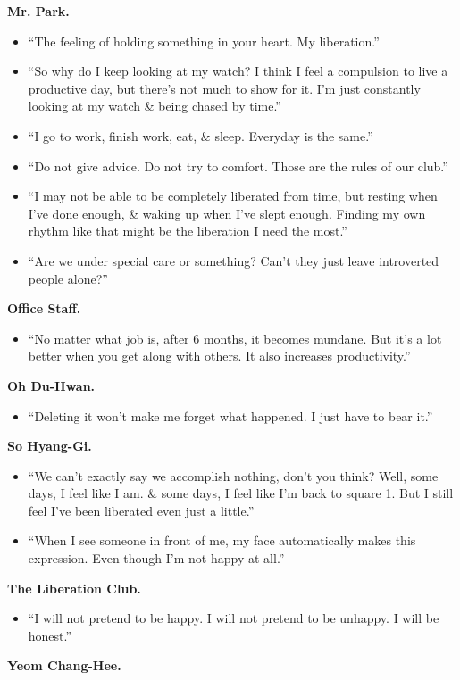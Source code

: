 \documentclass{article}
\numberwithin{equation}{section}
\begin{document}
\begin{enumerate}
	\textbf{Mr. Park.}
	\begin{itemize}
		\item ``The feeling of holding something in your heart. My liberation.''
		\item ``So why do I keep looking at my watch? I think I feel a compulsion to live a productive day, but there's not much to show for it. I'm just constantly looking at my watch \& being chased by time.''
		\item ``I go to work, finish work, eat, \& sleep. Everyday is the same.''
		\item ``Do not give advice. Do not try to comfort. Those are the rules of our club.''
		\item ``I may not be able to be completely liberated from time, but resting when I've done enough, \& waking up when I've slept enough. Finding my own rhythm like that might be the liberation I need the most.''
		\item ``Are we under special care or something? Can't they just leave introverted people alone?''
	\end{itemize}
	\textbf{Office Staff.}
	\begin{itemize}
		\item ``No matter what job is, after 6 months, it becomes mundane. But it's a lot better when you get along with others. It also increases productivity.''
	\end{itemize}
	\textbf{Oh Du-Hwan.}
	\begin{itemize}
		\item ``Deleting it won't make me forget what happened. I just have to bear it.''
	\end{itemize}
	\textbf{So Hyang-Gi.}
	\begin{itemize}
		\item ``We can't exactly say we accomplish nothing, don't you think? Well, some days, I feel like I am. \& some days, I feel like I'm back to square 1. But I still feel I've been liberated even just a little.''
		\item ``When I see someone in front of me, my face automatically makes this expression. Even though I'm not happy at all.''
	\end{itemize}
	\textbf{The Liberation Club.}
	\begin{itemize}
		\item ``I will not pretend to be happy. I will not pretend to be unhappy. I will be honest.''
	\end{itemize}
	\textbf{Yeom Chang-Hee.}
	\begin{itemize}

\end{itemize}
\end{enumerate}
\end{document}
